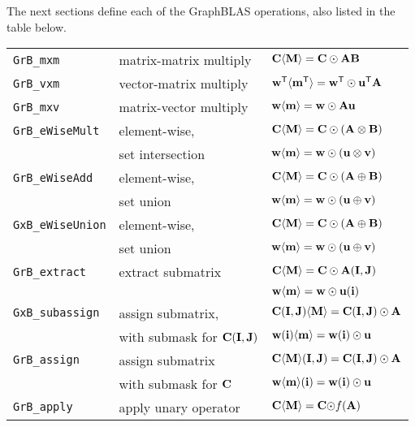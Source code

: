 \documentclass[12pt]{article}
\begin{document}
The next sections define each of the GraphBLAS operations, also listed in the
table below.

\vspace{0.2in}
{\small
\begin{tabular}{lll}
\hline
\verb'GrB_mxm'       & matrix-matrix multiply  & ${\bf C \langle M \rangle = C \odot AB}$ \\
\verb'GrB_vxm'       & vector-matrix multiply  & ${\bf w^{\sf T}\langle m^{\sf T}\rangle = w^{\sf T}\odot u^{\sf T}A}$ \\
\verb'GrB_mxv'       & matrix-vector multiply  & ${\bf w \langle m \rangle = w \odot Au}$ \\
\hline
\verb'GrB_eWiseMult' & element-wise,           & ${\bf C \langle M \rangle = C \odot (A \otimes B)}$ \\
                     & set intersection        & ${\bf w \langle m \rangle = w \odot (u \otimes v)}$ \\
\hline
\verb'GrB_eWiseAdd'  & element-wise,           & ${\bf C \langle M \rangle = C \odot (A \oplus  B)}$ \\
                     & set union               & ${\bf w \langle m \rangle = w \odot (u \oplus  v)}$ \\
\hline
\verb'GxB_eWiseUnion'& element-wise,           & ${\bf C \langle M \rangle = C \odot (A \oplus  B)}$ \\
                     & set union               & ${\bf w \langle m \rangle = w \odot (u \oplus  v)}$ \\
\hline
\verb'GrB_extract'   & extract submatrix       & ${\bf C \langle M \rangle = C \odot A(I,J)}$ \\
                     &                         & ${\bf w \langle m \rangle = w \odot u(i)}$ \\
\hline
\verb'GxB_subassign' & assign submatrix,       & ${\bf C (I,J) \langle M \rangle = C(I,J) \odot A}$ \\
                     & with submask for ${\bf C(I,J)}$
                                               & ${\bf w (i)   \langle m \rangle = w(i)   \odot u}$ \\
\hline
\verb'GrB_assign'    & assign submatrix        & ${\bf C \langle M \rangle (I,J) = C(I,J) \odot A}$ \\
                     & with submask for ${\bf C}$
                                               & ${\bf w \langle m \rangle (i)   = w(i)   \odot u}$ \\
\hline
\verb'GrB_apply'     & apply unary operator    & ${\bf C \langle M \rangle = C \odot} f{\bf (A)}$ \\

\end{tabular}}
\end{document}
